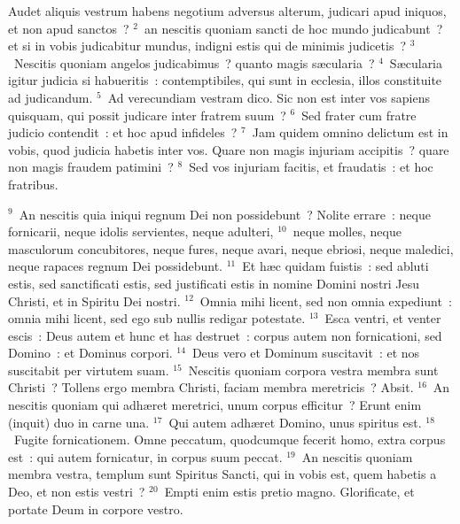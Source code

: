 \lettrine[lines=10,image=true,loversize=0.05,lraise=-0.03]{A}{}udet aliquis vestrum habens negotium adversus alterum, judicari apud iniquos, et non apud sanctos~?
${}^{2}$~an nescitis quoniam sancti de hoc mundo judicabunt~? et si in vobis judicabitur mundus, indigni estis qui de minimis judicetis~?
${}^{3}$~Nescitis quoniam angelos judicabimus~? quanto magis s\ae cularia~?
${}^{4}$~S\ae cularia igitur judicia si habueritis~: contemptibiles, qui sunt in ecclesia, illos constituite ad judicandum.
${}^{5}$~Ad verecundiam vestram dico. Sic non est inter vos sapiens quisquam, qui possit judicare inter fratrem suum~?
${}^{6}$~Sed frater cum fratre judicio contendit~: et hoc apud infideles~?
${}^{7}$~Jam quidem omnino delictum est in vobis, quod judicia habetis inter vos. Quare non magis injuriam accipitis~? quare non magis fraudem patimini~?
${}^{8}$~Sed vos injuriam facitis, et fraudatis~: et hoc fratribus.


${}^{9}$~An nescitis quia iniqui regnum Dei non possidebunt~? Nolite errare~: neque fornicarii, neque idolis servientes, neque adulteri,
${}^{10}$~neque molles, neque masculorum concubitores, neque fures, neque avari, neque ebriosi, neque maledici, neque rapaces regnum Dei possidebunt.
${}^{11}$~Et h\ae c quidam fuistis~: sed abluti estis, sed sanctificati estis, sed justificati estis in nomine Domini nostri Jesu Christi, et in Spiritu Dei nostri.
${}^{12}$~Omnia mihi licent, sed non omnia expediunt~: omnia mihi licent, sed ego sub nullis redigar potestate.
${}^{13}$~Esca ventri, et venter escis~: Deus autem et hunc et has destruet~: corpus autem non fornicationi, sed Domino~: et Dominus corpori.
${}^{14}$~Deus vero et Dominum suscitavit~: et nos suscitabit per virtutem suam.
${}^{15}$~Nescitis quoniam corpora vestra membra sunt Christi~? Tollens ergo membra Christi, faciam membra meretricis~? Absit.
${}^{16}$~An nescitis quoniam qui adh\ae ret meretrici, unum corpus efficitur~? Erunt enim (inquit) duo in carne una.
${}^{17}$~Qui autem adh\ae ret Domino, unus spiritus est.
${}^{18}$~Fugite fornicationem. Omne peccatum, quodcumque fecerit homo, extra corpus est~: qui autem fornicatur, in corpus suum peccat.
${}^{19}$~An nescitis quoniam membra vestra, templum sunt Spiritus Sancti, qui in vobis est, quem habetis a Deo, et non estis vestri~?
${}^{20}$~Empti enim estis pretio magno. Glorificate, et portate Deum in corpore vestro.

